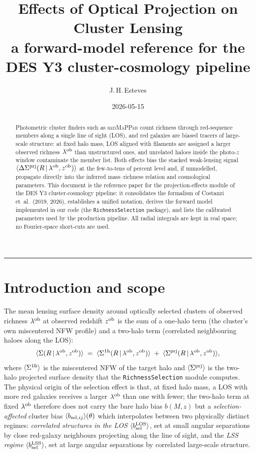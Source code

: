 \documentclass[a4paper, 11pt]{article}
\title{\vspace{-4ex}\huge \textbf{Effects of Optical Projection on
        Cluster Lensing}\\[0.5ex]
       \Large \textbf{a forward-model reference for the DES Y3
                      cluster-cosmology pipeline}}
\author{J.\,H.\,Esteves}
\date{2026-05-15}
\newcommand{\lob}{\lambda^{\rm ob}}
\newcommand{\zob}{z^{\rm ob}}
\newcommand{\bbLOS}{\avg{b_{\rm sel}^{\rm LOS}}}
\newcommand{\bbLSS}{\avg{b_{\rm sel}^{\rm LSS}}}
\newcommand{\bbselij}{\avg{b_{{\rm sel},ij}}}
\newcommand{\Sprj}{\Sigma^{\rm prj}}
\newcommand{\DSprj}{\Delta\Sigma^{\rm prj}}
\newcommand{\avg}[1]{\langle #1 \rangle}
\begin{document}
\maketitle

\begin{abstract}
Photometric cluster finders such as \textsc{redMaPPer} count richness
through red-sequence members along a single line of sight (LOS), and red
galaxies are biased tracers of large-scale structure: at fixed halo mass,
LOS aligned with filaments are assigned a larger observed richness $\lob$
than unstructured ones, and unrelated haloes inside the photo-$z$
window contaminate the member list.  Both effects bias the stacked
weak-lensing signal $\avg{\DSprj(R\,|\,\lob,\zob)}$ at the few-to-tens of
percent level and, if unmodelled, propagate directly into the inferred
mass--richness relation and cosmological parameters.  This document is
the reference paper for the projection-effects module of the DES Y3
cluster-cosmology pipeline: it consolidates the formalism of
Costanzi et~al.\ (2019, 2026), establishes a unified notation, derives
the forward model implemented in our code (the
\texttt{RichnessSelection} package), and lists the calibrated parameters
used by the production pipeline.  All radial integrals are kept in real
space; no Fourier-space short-cuts are used.
\end{abstract}

\tableofcontents
\vspace{1ex}\hrule\vspace{1ex}

\section{Introduction and scope}
\label{sec:intro}

The mean lensing surface density around optically selected clusters of
observed richness $\lob$ at observed redshift $\zob$ is the sum of a
one-halo term (the cluster's own miscentered NFW profile) and a
two-halo term (correlated neighbouring haloes along the LOS):
\begin{equation}
\avg{\Sigma(R\,|\,\lob,\zob)} \;=\;
\avg{\Sigma^{\rm 1h}(R\,|\,\lob,\zob)} \;+\;
\avg{\Sprj(R\,|\,\lob,\zob)} ,
\label{eq:sigma_split}
\end{equation}
where $\avg{\Sigma^{\rm 1h}}$ is the miscentered NFW of the target halo
and $\avg{\Sprj}$ is the two-halo projected surface density that the
\texttt{RichnessSelection} module computes.  The physical origin of the
selection effect is that, at fixed halo mass, a LOS with more red
galaxies receives a larger $\lob$ than one with fewer; the two-halo
term at fixed $\lob$ therefore does not carry the bare halo bias
$b(M,z)$ but a \emph{selection-affected} cluster bias
$\bbselij(\theta)$ which interpolates between
two physically distinct regimes: \emph{correlated structures in the
LOS} $\bbLOS$, set at small angular separations by close red-galaxy
neighbours projecting along the line of sight, and the \emph{LSS
regime} $\bbLSS$, set at large angular separations by correlated
large-scale structure.
\end{document}
